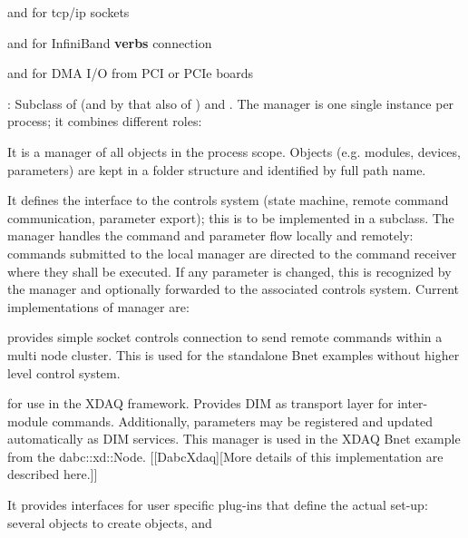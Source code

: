 \begin{compactdesc}
\begin{compactitem}[$\bullet$]
\item {} and  for tcp/ip sockets
\item {} and  for InfiniBand {\bf verbs} connection
\item {} and  for DMA I/O from PCI or PCIe boards  
\end{compactitem}
\item[\class{dabc::Manager}] : Subclass of  (and by that also of ) 
   and . The manager is one single instance per process; 
   it combines different roles: 
\begin{compactenum}
      \item It is a manager of all  objects in the process scope. 
      Objects (e.g. modules, devices, parameters) are kept 
      in a folder structure and identified by full path name. 
      \item It defines the interface to the controls system (state machine, 
      remote command communication, parameter export); this is to be implemented 
      in a subclass. The manager handles the command and parameter flow 
      locally and remotely: commands submitted to the local manager are 
      directed to the command receiver where they shall be executed. 
      If any parameter is changed, this is recognized by the manager 
      and optionally forwarded to the associated controls system. Current 
      implementations of manager are:
\begin{compactitem}[$\bullet$]
   \item {} provides simple socket controls connection to 
	 send remote commands within a multi node cluster. This is used for the 
	 standalone Bnet examples without higher level control system.
   \item {} for use in the XDAQ framework. Provides DIM as 
	 transport layer for inter-module commands. Additionally, 
	 parameters may be registered and updated automatically as 
	 DIM services. This manager is used in the XDAQ Bnet example 
	 from the dabc::xd::Node. [[DabcXdaq][More details of this 
	 implementation are described here.]]
\end{compactitem}
      \item It provides interfaces for user specific plug-ins that define 
      the actual set-up: several  objects to create objects, and 

\end{compactenum}
\end{compactdesc}
